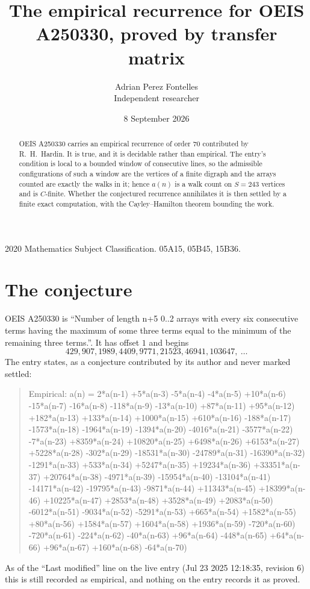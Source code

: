 \documentclass[11pt,a4paper]{article}
\title{The empirical recurrence for OEIS A250330, proved by transfer matrix}
\author{Adrian Perez Fontelles\\ \small Independent researcher}
\date{8 September 2026}
\theoremstyle{plain}
\theoremstyle{definition}
\begin{document}
\maketitle

\begin{abstract}
OEIS A250330 carries an empirical recurrence of order $70$ contributed by R.~H.~Hardin. It is
true, and it is decidable rather than empirical. The entry's condition is local to a bounded window of consecutive lines, so
the admissible configurations of such a window are the vertices of a finite digraph and the
arrays counted are exactly the walks in it; hence $a(n)$ is a walk count on $S=243$ vertices
and is $C$-finite. Whether the conjectured recurrence annihilates it is then settled by a
finite exact computation, with the Cayley--Hamilton theorem bounding the work.
\end{abstract}

\noindent\small 2020 Mathematics Subject Classification. 05A15, 05B45, 15B36.\normalsize

\section{The conjecture}

OEIS A250330 is ``Number of length n+5 0..2 arrays with every six consecutive terms having the maximum of some three terms equal to the minimum of the remaining three terms.''. It has offset $1$ and begins
\[
429, 907, 1989, 4409, 9771, 21523, 46941, 103647,\ \dots
\]
The entry states, as a conjecture contributed by its author and never marked settled:
\begin{quote}
Empirical: a(n) = 2*a(n-1) +5*a(n-3) -5*a(n-4) -4*a(n-5) +10*a(n-6) -15*a(n-7) -16*a(n-8) -118*a(n-9) -13*a(n-10) +87*a(n-11) +95*a(n-12) +182*a(n-13) +133*a(n-14) +1000*a(n-15) +610*a(n-16) -188*a(n-17) -1573*a(n-18) -1964*a(n-19) -1394*a(n-20) -4016*a(n-21) -3577*a(n-22) -7*a(n-23) +8359*a(n-24) +10820*a(n-25) +6498*a(n-26) +6153*a(n-27) +5228*a(n-28) -302*a(n-29) -18531*a(n-30) -24789*a(n-31) -16390*a(n-32) -1291*a(n-33) +533*a(n-34) +5247*a(n-35) +19234*a(n-36) +33351*a(n-37) +20764*a(n-38) -4971*a(n-39) -15954*a(n-40) -13104*a(n-41) -14171*a(n-42) -19795*a(n-43) -9871*a(n-44) +11343*a(n-45) +18399*a(n-46) +10225*a(n-47) +2853*a(n-48) +3528*a(n-49) +2083*a(n-50) -6012*a(n-51) -9034*a(n-52) -5291*a(n-53) +665*a(n-54) +1582*a(n-55) +80*a(n-56) +1584*a(n-57) +1604*a(n-58) +1936*a(n-59) -720*a(n-60) -720*a(n-61) -224*a(n-62) -40*a(n-63) +96*a(n-64) -448*a(n-65) +64*a(n-66) +96*a(n-67) +160*a(n-68) -64*a(n-70)
\end{quote}
As of the ``Last modified'' line on the live entry (Jul 23 2025 12:18:35, revision 6) this is still
recorded as empirical, and nothing on the entry records it as proved.
\end{document}

